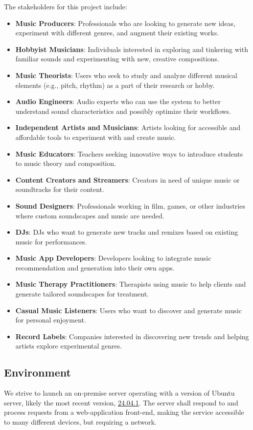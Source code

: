 \documentclass{article}
\begin{document}
The stakeholders for this project include:
\begin{itemize}
    \item \textbf{Music Producers}: Professionals who are looking to generate new ideas, experiment with different genres, and augment their existing works.
    \item \textbf{Hobbyist Musicians}: Individuals interested in exploring and tinkering with familiar sounds and experimenting with new, creative compositions.
    \item \textbf{Music Theorists}: Users who seek to study and analyze different musical elements (e.g., pitch, rhythm) as a part of their research or hobby.
    \item \textbf{Audio Engineers}: Audio experts who can use the system to better understand sound characteristics and possibly optimize their workflows.
    \item \textbf{Independent Artists and Musicians}: Artists looking for accessible and affordable tools to experiment with and create music.
    \item \textbf{Music Educators}: Teachers seeking innovative ways to introduce students to music theory and composition.
    \item \textbf{Content Creators and Streamers}: Creators in need of unique music or soundtracks for their content.
    \item \textbf{Sound Designers}: Professionals working in film, games, or other industries where custom soundscapes and music are needed.
    \item \textbf{DJs}: DJs who want to generate new tracks and remixes based on existing music for performances.
    \item \textbf{Music App Developers}: Developers looking to integrate music recommendation and generation into their own apps.
    \item \textbf{Music Therapy Practitioners}: Therapists using music to help clients and generate tailored soundscapes for treatment.
    \item \textbf{Casual Music Listeners}: Users who want to discover and generate music for personal enjoyment.
    \item \textbf{Record Labels}: Companies interested in discovering new trends and helping artists explore experimental genres.
\end{itemize}


\subsection{Environment}
We strive to launch an on-premise server operating with a version of Ubuntu server, likely the most recent version, \href{https://ubuntu.com/download/server}{24.04.1}. The server shall respond to and process requests from a web-application front-end, making the service accessible to many different devices, but requiring a network.
\end{document}
